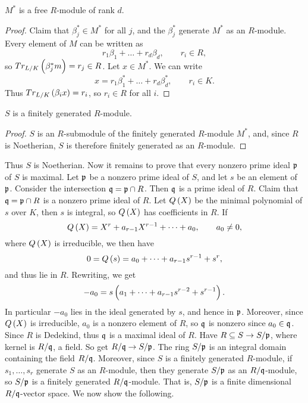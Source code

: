 \begin{corollary}
$ M^* $ is a free $ R $-module of rank $ d $.
\end{corollary}

\begin{proof}
Claim that $ \beta_j^* \in M^* $ for all $ j $, and the $ \beta_j^* $ generate $ M^* $ as an $ R $-module. Every element of $ M $ can be written as
$$ r_1\beta_1 + \dots + r_d\beta_d, \qquad r_i \in R, $$
so $ Tr_{L / K}\br{\beta_j^*m} = r_j \in R $. Let $ x \in M^* $. We can write
$$ x = r_1\beta_1^* + \dots + r_d\beta_d^*, \qquad r_i \in K. $$
Thus $ Tr_{L / K}\br{\beta_ix} = r_i $, so $ r_i \in R $ for all $ i $.
\end{proof}

\pagebreak

\begin{corollary}
$ S $ is a finitely generated $ R $-module.
\end{corollary}

\begin{proof}
$ S $ is an $ R $-submodule of the finitely generated $ R $-module $ M^* $, and, since $ R $ is Noetherian, $ S $ is therefore finitely generated as an $ R $-module.
\end{proof}

Thus $ S $ is Noetherian. Now it remains to prove that every nonzero prime ideal $ \mathfrak{p} $ of $ S $ is maximal. Let $ \mathfrak{p} $ be a nonzero prime ideal of $ S $, and let $ s $ be an element of $ \mathfrak{p} $. Consider the intersection $ \mathfrak{q} = \mathfrak{p} \cap R $. Then $ \mathfrak{q} $ is a prime ideal of $ R $. Claim that $ \mathfrak{q} = \mathfrak{p} \cap R $ is a nonzero prime ideal of $ R $. Let $ Q\br{X} $ be the minimal polynomial of $ s $ over $ K $, then $ s $ is integral, so $ Q\br{X} $ has coefficients in $ R $. If
$$ Q\br{X} = X^r + a_{r - 1}X^{r - 1} + \dots + a_0, \qquad a_0 \ne 0, $$
where $ Q\br{X} $ is irreducible, we then have
$$ 0 = Q\br{s} = a_0 + \dots + a_{r - 1}s^{r - 1} + s^r, $$
and thus lie in $ R $. Rewriting, we get
$$ -a_0 = s\br{a_1 + \dots + a_{r - 1}s^{r - 2} + s^{r - 1}}. $$
In particular $ -a_0 $ lies in the ideal generated by $ s $, and hence in $ \mathfrak{p} $. Moreover, since $ Q\br{X} $ is irreducible, $ a_0 $ is a nonzero element of $ R $, so $ \mathfrak{q} $ is nonzero since $ a_0 \in \mathfrak{q} $. Since $ R $ is Dedekind, thus $ \mathfrak{q} $ is a maximal ideal of $ R $. Have $ R \subseteq S \to S / \mathfrak{p} $, where kernel is $ R / \mathfrak{q} $, a field. So get $ R / \mathfrak{q} \to S / \mathfrak{p} $. The ring $ S / \mathfrak{p} $ is an integral domain containing the field $ R / \mathfrak{q} $. Moreover, since $ S $ is a finitely generated $ R $-module, if $ s_1, \dots, s_r $ generate $ S $ as an $ R $-module, then they generate $ S / \mathfrak{p} $ as an $ R / \mathfrak{q} $-module, so $ S / \mathfrak{p} $ is a finitely generated $ R / \mathfrak{q} $-module. That is, $ S / \mathfrak{p} $ is a finite dimensional $ R / \mathfrak{q} $-vector space. We now show the following.

